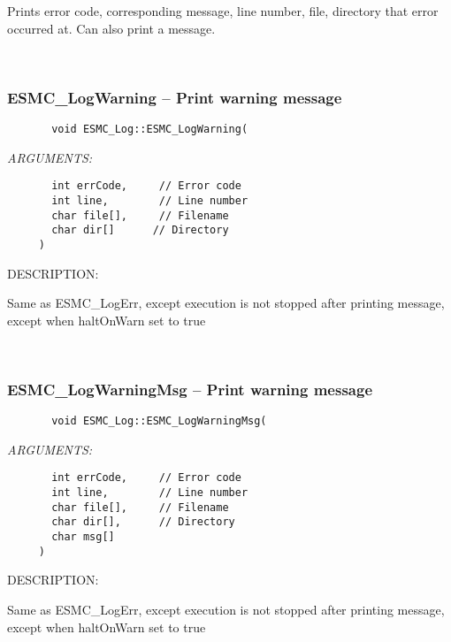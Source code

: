    Prints error code, corresponding message, line number, file, directory
   that error occurred at.  Can also print a message. 
 
\mbox{}\hrulefill\ 
 
\subsubsection [ESMC\_LogWarning] {ESMC\_LogWarning -- Print warning message}


  
\begin{verbatim}       void ESMC_Log::ESMC_LogWarning(\end{verbatim}{\em ARGUMENTS:}
\begin{verbatim}       int errCode,     // Error code
       int line,        // Line number
       char file[],     // Filename
       char dir[]      // Directory
     )\end{verbatim}
{\sf DESCRIPTION:\\ }


    Same as ESMC\_LogErr, except execution is not stopped after
    printing message, except when haltOnWarn set to true
   
 
\mbox{}\hrulefill\ 
 
\subsubsection [ESMC\_LogWarningMsg] {ESMC\_LogWarningMsg -- Print warning message}


  
\begin{verbatim}       void ESMC_Log::ESMC_LogWarningMsg(\end{verbatim}{\em ARGUMENTS:}
\begin{verbatim}       int errCode,     // Error code
       int line,        // Line number
       char file[],     // Filename
       char dir[],      // Directory
       char msg[]
     )\end{verbatim}
{\sf DESCRIPTION:\\ }


    Same as ESMC\_LogErr, except execution is not stopped after
    printing message, except when haltOnWarn set to true
   
 
